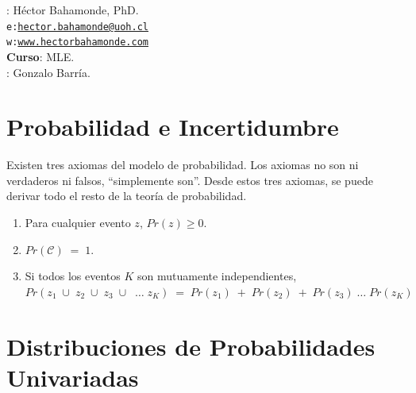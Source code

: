 \documentclass[onesided]{article}\usepackage[]{graphicx}\usepackage[]{color}
\begin{document}











\hspace{-5mm}{\bf Profesor}: H\'ector Bahamonde, PhD.\\
\texttt{e:}\href{mailto:hector.bahamonde@uoh.cl}{\texttt{hector.bahamonde@uoh.cl}}\\
\texttt{w:}\href{http://www.hectorbahamonde.com}{\texttt{www.hectorbahamonde.com}}\\
{\bf Curso}: MLE.\\
\hspace{-5mm}{\bf TA}: Gonzalo Barr\'ia.


\section{Probabilidad e Incertidumbre}

Existen tres axiomas del modelo de probabilidad. Los axiomas no son ni verdaderos ni falsos, ``simplemente son''. Desde estos tres axiomas, se puede derivar todo el resto de la teor\'ia de probabilidad.

\begin{enumerate}
  \item Para cualquier evento $z$, $Pr(z) \geq 0$. %
  \item  $Pr(\mathcal{C}) \;=\; 1$.  %
  \item Si todos los eventos $K$ son mutuamente independientes, $Pr(z_{1} \;\cup\;  z_{2} \;\cup\; z_{3} \;\cup\; \;\ldots\; z_{K}) \;=\; Pr(z_{1}) \;+\; Pr(z_{2})  \;+\; Pr(z_{3}) \;\ldots\; Pr(z_{K})$
\end{enumerate}

\section{Distribuciones de Probabilidades Univariadas}
\end{document}
